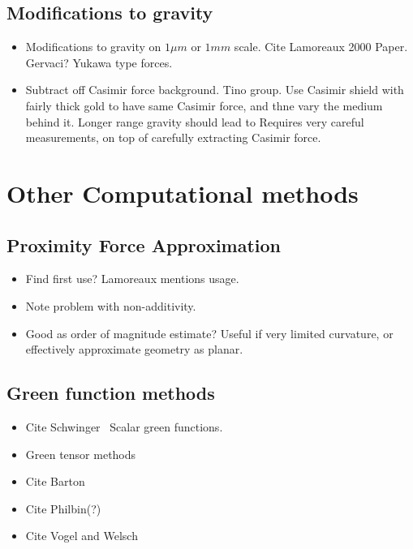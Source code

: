 \subsection{Modifications to gravity}

\begin{itemize}
\item Modifications to gravity on $1\mu m$ or $1mm$ scale.  Cite Lamoreaux 2000 Paper.  Gervaci?
Yukawa type forces.  
\item Subtract off Casimir force background.  Tino group.  Use Casimir shield with fairly thick gold to have same Casimir force, and thne vary the medium behind it.  Longer range gravity should lead to 
Requires very careful measurements, on top of carefully extracting Casimir force.   
\end{itemize}

\section{Other Computational methods}

\subsection{Proximity Force Approximation}

\begin{itemize}
\item Find first use?  Lamoreaux mentions usage.  
\item Note problem with non-additivity. 
\item Good as order of magnitude estimate?  Useful if very limited curvature, or effectively approximate geometry as planar.  
\end{itemize}

\subsection{Green function methods}

\begin{itemize}
\item Cite Schwinger~\cite{Schwinger1978, Milton1978}  Scalar green functions.  
\item Green tensor methods
\item Cite Barton
\item Cite Philbin(?)
\item Cite Vogel and Welsch
\end{itemize}

